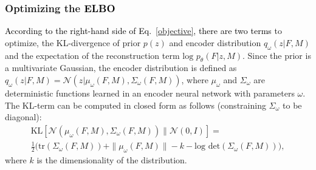 \documentclass[journal]{IEEEtran}
\newcommand{\update}[1]{\textcolor{black}{#1}}
\begin{document}
\subsubsection{Optimizing the \update{ELBO}}
\update{According to the right-hand side of Eq.~\ref{objective}, there are two terms} to optimize, the KL-divergence of prior $p(z)$ and encoder distribution $q_\omega(z|F,M)$ and the expectation of the reconstruction term $\text{log } p_\theta(F|z,M)$.
Since the prior is a multivariate Gaussian, the encoder distribution is defined as $q_\omega(z|F,M)=\mathcal{N}(z|\mu_\omega(F,M),\Sigma_\omega(F,M))$, where $\mu_\omega$ and $\Sigma_\omega$ are deterministic functions learned in an encoder neural network with parameters $\omega$. The KL-term can be computed in closed form as follows (constraining $\Sigma_\omega$ to be diagonal):
\begin{multline*}
\text{KL}[\mathcal{N}(\mu_\omega(F,M), \Sigma_\omega(F,M))\| \mathcal{N}(0,I)] = \\
\frac{1}{2} \Big( \text{tr}(\Sigma_\omega(F,M)) + \|\mu_\omega(F,M) \| - k - \text{log det} (\Sigma_\omega(F,M)) \Big),
\end{multline*}
where $k$ is the dimensionality of the distribution. 
\end{document}
